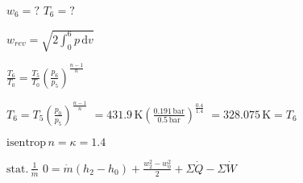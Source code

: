 \( w_6 = ? \)  
\( T_6 = ? \)  

\( w_{rev} = \sqrt{2 \int_0^6 p \, \text{d}v} \)  

\( \frac{T_6}{T_0} = \frac{T_5}{T_0} \left( \frac{p_6}{p_5} \right)^{\frac{n-1}{n}} \)  

\( T_6 = T_5 \left( \frac{p_0}{p_5} \right)^{\frac{n-1}{n}} \)  
\( = 431.9 \, \text{K} \left( \frac{0.191 \, \text{bar}}{0.5 \, \text{bar}} \right)^{\frac{0.4}{1.4}} \)  
\( = 328.075 \, \text{K} = T_6 \)  

\( \text{isentrop} \, n = \kappa = 1.4 \)  

\( \text{stat.} \, \frac{1}{\dot{m}} \)  
\( 0 = \dot{m} \left( h_2 - h_0 \right) + \frac{w_2^2 - w_0^2}{2} + \Sigma \dot{Q} - \Sigma \dot{W} \)